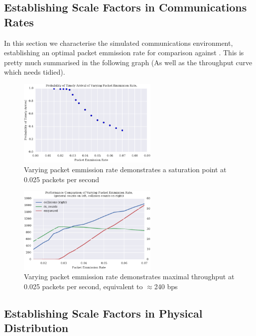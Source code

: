 \documentclass[runningheads,a4paper]{llncs}
\begin{document}
\subsection{Establishing Scale Factors in Communications Rates}

In this section we characterise the simulated communications environment, establishing an optimal packet emmission rate for comparison against \cite{Guo11}. This is pretty much summarised in the following graph (As well as the throughput curve which needs tidied).

\begin{figure}[h]
  \centering
  \includegraphics[width=0.6\textwidth]{img/prod_breakdown_static.pdf}
  \caption{Varying packet emmission rate demonstrates a saturation point at 0.025 packets per second}
  \label{fig:prod_breakdown}
\end{figure}
\begin{figure}[h]
  \centering
  \includegraphics[width=0.6\textwidth]{img/throughput_performance_static.pdf}
  \caption{Varying packet emmission rate demonstrates maximal throughput at 0.025 packets per second, equivalent to $\approx$240 bps}
  \label{fig:throughput_performance}
\end{figure}


\subsection{Establishing Scale Factors in Physical Distribution}
\end{document}
